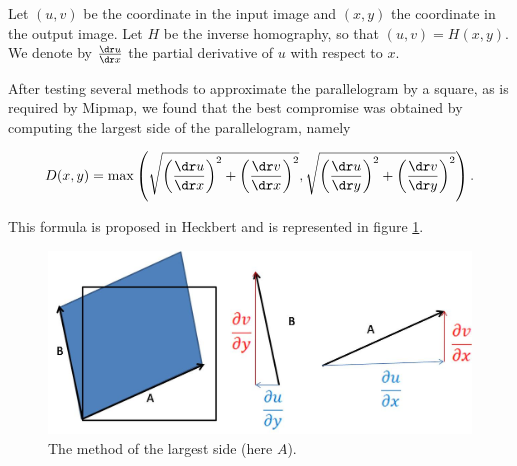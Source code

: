 Let $(u,v)$ be the coordinate in the input image and $(x,y)$ the coordinate in the output image. Let $H$ be the inverse homography, so that $(u,v)=H(x,y)$. We denote by $\frac{\dr u}{\dr x}$ the partial derivative of $u$ with respect to $x$.

After testing several methods to approximate the parallelogram by a square, as is required by Mipmap, we found that the best compromise was obtained by computing the largest side of the parallelogram, namely










$$ D(x,y) = \max \left(\sqrt{\left(\frac{\dr u}{\dr x}\right)^2 + \left(\frac{\dr v}{\dr x}\right)^2},\sqrt{\left(\frac{\dr u}{\dr y}\right)^2 + \left(\frac{\dr v}{\dr y}\right)^2}\right).$$

This formula is proposed in Heckbert \cite{heckbert1983texture} and is represented in figure \ref{methode_plus_grand_cote}.


\begin{figure}[h!]
\centering
\includegraphics[scale=0.5]{methode_plus_grand_cote.jpg}
\caption{The method of the largest side  (here $A$).}
\label{methode_plus_grand_cote}
\end{figure}


